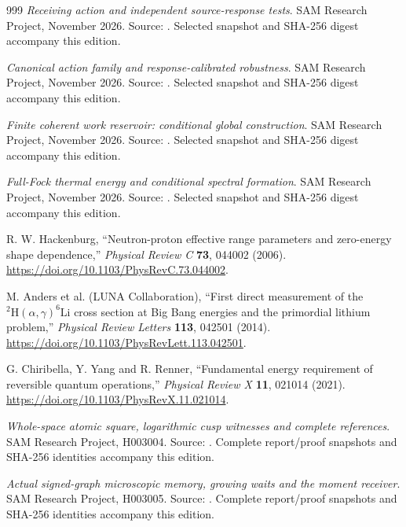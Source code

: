 \begin{thebibliography}{999}
\emph{Receiving action and independent source-response tests}. SAM Research Project, November 2026.
Source: . Selected snapshot and SHA-256 digest accompany this edition.

\emph{Canonical action family and response-calibrated robustness}. SAM Research Project, November 2026.
Source: . Selected snapshot and SHA-256 digest accompany this edition.

\emph{Finite coherent work reservoir: conditional global construction}. SAM Research Project, November 2026.
Source: . Selected snapshot and SHA-256 digest accompany this edition.

\emph{Full-Fock thermal energy and conditional spectral formation}. SAM Research Project, November 2026.
Source: . Selected snapshot and SHA-256 digest accompany this edition.

 R. W. Hackenburg, ``Neutron-proton effective range parameters and zero-energy shape dependence,'' \emph{Physical Review C} \textbf{73}, 044002 (2006). \url{https://doi.org/10.1103/PhysRevC.73.044002}.

 M. Anders et al. (LUNA Collaboration), ``First direct measurement of the $^2\mathrm H(\alpha,\gamma)^6\mathrm{Li}$ cross section at Big Bang energies and the primordial lithium problem,'' \emph{Physical Review Letters} \textbf{113}, 042501 (2014). \url{https://doi.org/10.1103/PhysRevLett.113.042501}.

 G. Chiribella, Y. Yang and R. Renner, ``Fundamental energy requirement of reversible quantum operations,'' \emph{Physical Review X} \textbf{11}, 021014 (2021). \url{https://doi.org/10.1103/PhysRevX.11.021014}.

\emph{Whole-space atomic square, logarithmic cusp witnesses and complete references}. SAM Research Project, H003004. Source: . Complete report/proof snapshots and SHA-256 identities accompany this edition.

\emph{Actual signed-graph microscopic memory, growing waits and the moment receiver}. SAM Research Project, H003005. Source: . Complete report/proof snapshots and SHA-256 identities accompany this edition.


\end{thebibliography}
